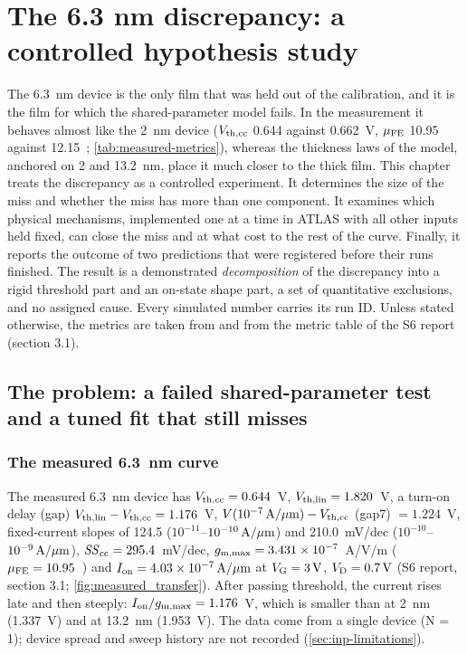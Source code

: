 \chapter{The 6.3 nm discrepancy: a controlled hypothesis study}\label{ch:6p3}

The 6.3~nm device is the only film that was held out of the calibration, and it is the film for which the shared-parameter model fails. In the measurement it behaves almost like the 2~nm device ($V_{\mathrm{th,cc}}$ 0.644 against 0.662~V, $\mu_{\mathrm{FE}}$ 10.95 against 12.15~\cmVs; \cref{tab:measured-metrics}), whereas the thickness laws of the model, anchored on 2 and 13.2~nm, place it much closer to the thick film. This chapter treats the discrepancy as a controlled experiment. It determines the size of the miss and whether the miss has more than one component. It examines which physical mechanisms, implemented one at a time in ATLAS with all other inputs held fixed, can close the miss and at what cost to the rest of the curve. Finally, it reports the outcome of two predictions that were registered before their runs finished. The result is a demonstrated \emph{decomposition} of the discrepancy into a rigid threshold part and an on-state shape part, a set of quantitative exclusions, and no assigned cause. Every simulated number carries its run ID. Unless stated otherwise, the metrics are taken from  and from the metric table of the S6 report (section 3.1).

\section{The problem: a failed shared-parameter test and a tuned fit that still misses}\label{sec:6p3-problem}

\subsection{The measured 6.3~nm curve}
The measured 6.3~nm device has $V_{\mathrm{th,cc}}=0.644$~V, $V_{\mathrm{th,lin}}=1.820$~V, a turn-on delay (gap) $V_{\mathrm{th,lin}}-V_{\mathrm{th,cc}}=1.176$~V, $V(10^{-7}\,\mathrm{A}/\mu\mathrm{m})-V_{\mathrm{th,cc}}$ (gap7) $=1.224$~V, fixed-current slopes of 124.5 ($10^{-11}$--$10^{-10}\,\mathrm{A}/\mu\mathrm{m}$) and 210.0~mV/dec ($10^{-10}$--$10^{-9}\,\mathrm{A}/\mu\mathrm{m}$), $\mathit{SS}_{\mathrm{cc}}=295.4$~mV/dec, $g_{\mathrm{m,max}}=3.431\times10^{-7}$~A/V/\textmu m ($\mu_{\mathrm{FE}}=10.95$~\cmVs) and $I_{\mathrm{on}}=4.03\times10^{-7}\,\mathrm{A}/\mu\mathrm{m}$ at $V_{\mathrm{G}}=\SI{3}{V}$, $V_{\mathrm{D}}=\SI{0.7}{V}$ (S6 report, section 3.1; \cref{fig:measured_transfer}). After passing threshold, the current rises late and then steeply: $I_{\mathrm{on}}/g_{\mathrm{m,max}}=1.176$~V, which is smaller than at 2~nm (1.337~V) and at 13.2~nm (1.953~V). The data come from a single device (N = 1); device spread and sweep history are not recorded (\cref{sec:inp-limitations}).

